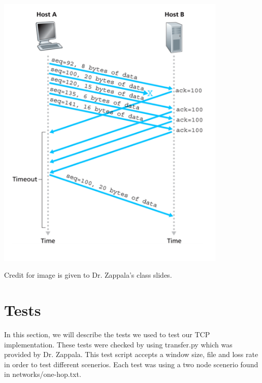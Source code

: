 \documentclass[11pt]{article}
\begin{document}
\includegraphics[width=11cm]{fast_transport.png}

Credit for image is given to Dr. Zappala's class slides.

\section{Tests}
In this section, we will describe the tests we used to test our TCP implementation. These tests were checked by using transfer.py which was provided by Dr. Zappala. This test script accepts a window size, file and loss rate in order to test different scenerios. Each test was using a two node scenerio found in networks/one-hop.txt.
\end{document}
